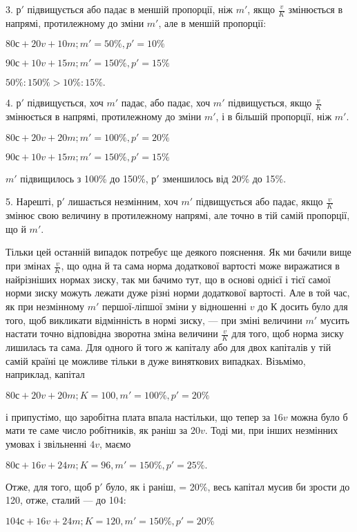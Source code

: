 
3. $р'$ підвищується або падає в меншій пропорції, ніж $m'$,
якщо $\frac{v}{K}$ змінюється в напрямі, протилежному до зміни $m'$, але
в меншій пропорції:

\begin{center}
$80с + 20 v + 10 m; m' = 50\%, p' = 10\%$

$90 с + 10 v + 15 m; m' = 150\%, p' = 15\%$

$50\% : 150\% > 10\% : 15\%.$
\end{center}

4. $р'$ підвищується, хоч $m'$ падає, або падає, хоч $m'$ підвищується,
якщо $\frac{v}{K}$ змінюється в напрямі, протилежному до зміни
$m'$, і в більшій пропорції, ніж $m'$.

\begin{center}
$80с + 20 v + 20 m; m' = 100\%, p' = 20\%$

$90 с + 10 v + 15 m; m' = 150\%, p' = 15\%$
\end{center}

\noindent $m'$ підвищилось з 100\% до 150\%, $р'$ зменшилось від 20\% до 15\%.

5. Нарешті, $р'$ лишається незмінним, хоч $m'$ підвищується або
падає, якщо $\frac{v}{K}$ змінює свою величину в протилежному напрямі,
але точно в тій самій пропорції, що й $m'$.

Тільки цей останній випадок потребує ще деякого пояснення.
Як ми бачили вище при змінах $\frac{v}{K}$, що одна й та сама норма
додаткової вартості може виражатися в найрізніших нормах
зиску, так ми бачимо тут, що в основі однієї і тієї самої норми
зиску можуть лежати дуже різні норми додаткової вартості.
Але в той час, як при незмінному $m'$ першої-ліпшої зміни у відношенні
$v$ до $К$ досить було для того, щоб викликати відмінність
в нормі зиску, $—$ при зміні величини $m'$ мусить настати точно
відповідна зворотна зміна величини $\frac{v}{K}$ для того, щоб норма
зиску лишилась та сама. Для одного й того ж капіталу або для
двох капіталів у тій самій країні це можливе тільки в дуже
виняткових випадках. Візьмімо, наприклад, капітал

\begin{center}
$80с + 20 v + 20 m; K = 100, m' = 100\%, p' = 20\%$
\end{center}

\noindent і припустімо, що заробітна плата впала настільки, що тепер за
$16 v$ можна було б мати те саме число робітників, як раніш за
$20 v$. Тоді ми, при інших незмінних умовах і звільненні $4 v$,
маємо

\begin{center}
$80с + 16 v + 24 m; K = 96, m' = 150\%, p' = 25\%.$
\end{center}

Отже, для того, щоб $р'$ було, як і раніш, = 20\%, весь капітал
мусив би зрости до 120, отже, сталий $—$ до 104:

\begin{center}
$104 с + 16 v + 24 m; K = 120, m' = 150\%, p' = 20\%$
\end{center}
